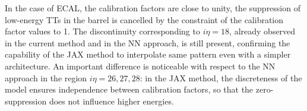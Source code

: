 \begin{figure}
    \centering
    \caption{}
    \label{fig:JAX_SFs}
\end{figure}

In the case of ECAL, the calibration factors are close to unity, the suppression of low-energy TTs in the barrel is cancelled by the constraint of the calibration factor values to 1. The discontinuity corresponding to $i\eta=18$, already observed in the current method and in the NN approach, is still present, confirming the capability of the JAX method to interpolate same pattern even with a simpler architecture. An important difference is noticeable with respect to the NN approach in the region $i\eta=26,27,28$: in the JAX method, the discreteness of the model ensures independence between calibration factors, so that the zero-suppression does not influence higher energies.

